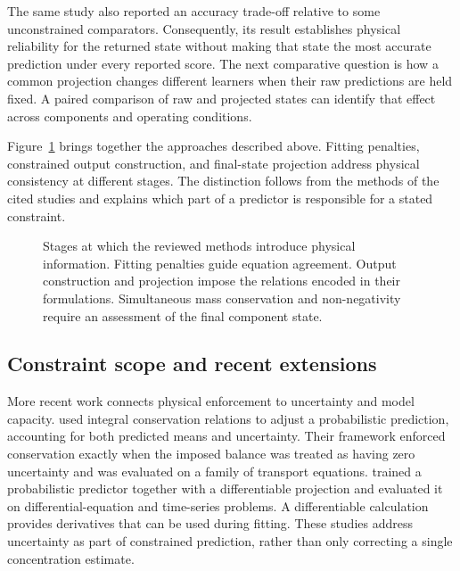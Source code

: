 The same study also reported an accuracy trade-off relative to some unconstrained comparators. Consequently, its result establishes physical reliability for the returned state without making that state the most accurate prediction under every reported score. The next comparative question is how a common projection changes different learners when their raw predictions are held fixed. A paired comparison of raw and projected states can identify that effect across components and operating conditions.

Figure~\ref{fig:rrl_enforcement_locations} brings together the approaches described above. Fitting penalties, constrained output construction, and final-state projection address physical consistency at different stages. The distinction follows from the methods of the cited studies and explains which part of a predictor is responsible for a stated constraint.

\begin{figure}[htbp]
\centering
\begingroup\linespread{1}\selectfont

\endgroup
\caption{Stages at which the reviewed methods introduce physical information. Fitting penalties guide equation agreement. Output construction and projection impose the relations encoded in their formulations. Simultaneous mass conservation and non-negativity require an assessment of the final component state.}
\label{fig:rrl_enforcement_locations}
\end{figure}

\subsection{Constraint scope and recent extensions}

More recent work connects physical enforcement to uncertainty and model capacity. \citet{Hansen2024} used integral conservation relations to adjust a probabilistic prediction, accounting for both predicted means and uncertainty. Their framework enforced conservation exactly when the imposed balance was treated as having zero uncertainty and was evaluated on a family of transport equations. \citet{Utkarsh2025} trained a probabilistic predictor together with a differentiable projection and evaluated it on differential-equation and time-series problems. A differentiable calculation provides derivatives that can be used during fitting. These studies address uncertainty as part of constrained prediction, rather than only correcting a single concentration estimate.

